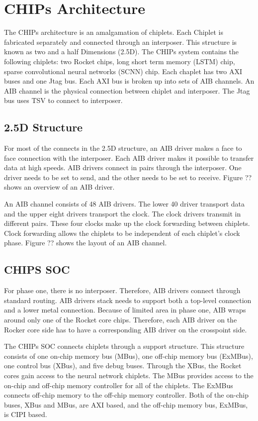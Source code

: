 \documentclass[../main.tex]{subfiles}
\begin{document}
\section{CHIPs Architecture}
The CHIPs architecture is an amalgamation of chiplets. Each Chiplet is fabricated separately and connected through an interposer. This structure is known as two and a half Dimensions (2.5D). The CHIPs system contains the following chiplets: two Rocket chips, long short term memory (LSTM) chip, sparse convolutional neural networks (SCNN) chip. Each chaplet has two AXI buses and one Jtag bus. Each AXI bus is broken up into sets of AIB channels. An AIB channel is the physical connection between chiplet and interposer. The Jtag bus uses TSV to connect to interposer.

\subsection{2.5D Structure}
For most of the connects in the 2.5D structure, an AIB driver makes a face to face connection with the interposer. Each AIB driver makes it possible to transfer data at high speeds. AIB drivers connect in pairs through the interposer. One driver needs to be set to send, and the other needs to be set to receive. Figure ?? shows an overview of an AIB driver. 

An AIB channel consists of 48 AIB drivers.  The lower 40 driver transport data and the upper eight drivers transport the clock. The clock drivers transmit in different pairs. These four clocks make up the clock forwarding between chiplets. Clock forwarding allows the chiplets to be independent of each chiplet's clock phase. Figure ?? shows the layout of an AIB channel.

\subsection{CHIPS SOC}
For phase one, there is no interposer. Therefore, AIB drivers connect through standard routing. AIB drivers stack needs to support both a top-level connection and a lower metal connection.  Because of limited area in phase one, AIB wraps around only one of the Rocket core chips. Therefore, each AIB driver on the Rocker core side has to have a corresponding AIB driver on the crosspoint side.

The CHIPs SOC connects chiplets through a support structure. This structure consists of one on-chip memory bus (MBus), one off-chip memory bus (ExMBus), one control bus (XBus), and five debug buses.  Through the XBus, the Rocket cores gain access to the neural network chiplets. The MBus provides access to the on-chip and off-chip memory controller for all of the chiplets. The ExMBus connects off-chip memory to the off-chip memory controller.  Both of the on-chip buses, XBus and MBus, are AXI based, and the off-chip memory bus, ExMBus, is CIPI based. 
\end{document}
